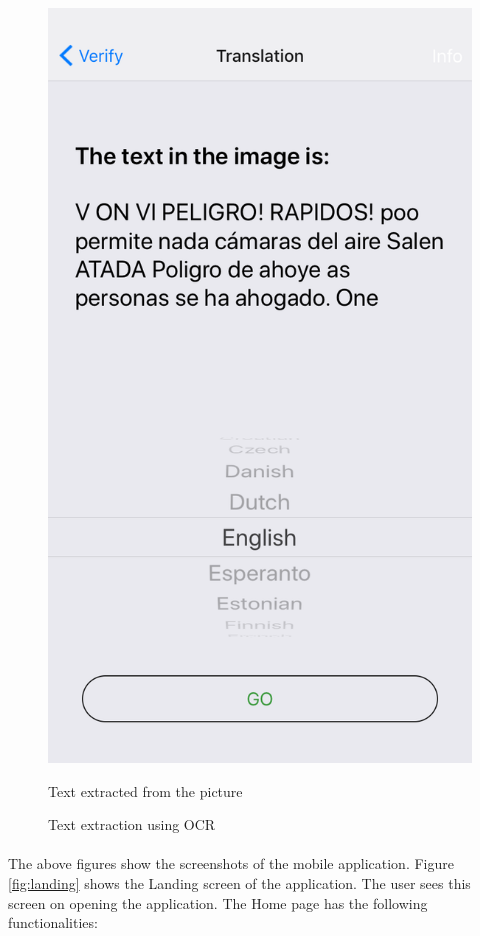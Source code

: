 \documentclass[12pt]{article}
\begin{document}
\begin{figure} [H]
\begin{minipage}{.5\textwidth}
  \includegraphics[width=0.9\linewidth]{media/2.PNG}
  \caption{Text extraction using OCR} {Text extracted from the  picture}
  \label{fig:ocr}
\end{minipage}
\end{figure}

\paragraph{}The above figures show the screenshots of the mobile application. Figure \ref{fig:landing} shows the Landing screen of the application. The user sees this screen on opening the application. The Home page has the following functionalities: 
\end{document}
